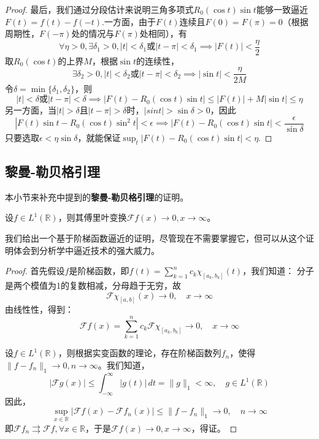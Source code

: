 \begin{proof}
    最后，我们通过分段估计来说明三角多项式$R_0(\cos t)\sin t$能够一致逼近$F(t)=f(t)-f(-t)$.一方面，由于$F(t)$连续且$F(0)=F(\pi)=0$（根据周期性，$F(-\pi)$处的情况与$F(\pi)$处相同），有
    $$\forall\eta>0,\exists\delta_1>0,|t|<\delta_1\text{或}|t-\pi|<\delta_1\implies |F(t)|<\frac{\eta}{2}$$
    取$R_0(\cos t)$的上界$M$，根据$\sin t$的连续性，
    $$\exists\delta_2>0,|t|<\delta_2\text{或}|t-\pi|<\delta_2\implies|\sin t|<\frac{\eta}{2M}$$
    令$\delta=\min\{\delta_1,\delta_2\}$，则
    $$|t|<\delta\text{或}|t-\pi|<\delta\implies |F(t)-R_0(\cos t)\sin t|\le|F(t)|+M|\sin t|\le\eta$$
    另一方面，当$|t|>\delta$且$|t-\pi|>\delta$时，$|sin t|>\sin\delta>0$，因此
    $$|F(t)\sin t-R_0(\cos t)\sin^2 t|<\epsilon\implies|F(t)-R_0(\cos t)\sin t|<\frac{\epsilon}{\sin\delta}$$
    只要选取$\epsilon<\eta\sin\delta$，就能保证$\sup_t |F(t)-R_0(\cos t)\sin t|<\eta$.
\end{proof}

\subsection{黎曼-勒贝格引理}\label{sub:riemman_lebesgue_lemma}
本小节来补充中提到的\textbf{黎曼-勒贝格引理}的证明。
\begin{theorem}[黎曼-勒贝格引理]\label{thm:riemann_lebesgue}
    设$f\in L^1(\mathbb{R})$，则其傅里叶变换$\mathcal{F} f(x)\to 0,x\to\infty$。
\end{theorem}
我们给出一个基于阶梯函数逼近的证明，尽管现在不需要掌握它，但可以从这个证明体会到分析学中逼近技术的强大威力。
\begin{proof}
    首先假设$f$是阶梯函数，即$f(t)=\sum_{k=1}^{n}c_k \chi_{[a_k,b_k]}(t)$，我们知道：
    分子是两个模值为1的复数相减，分母趋于无穷，故
    $$\mathcal{F} \chi_{[a,b]}(x)\to 0,\quad x\to\infty$$
    由线性性，得到：
    $$\mathcal{F} f(x)=\sum_{k=1}^n c_k\mathcal{F}\chi_{[a_k,b_k]}\to 0,\quad x\to\infty$$

    设$f\in L^1(\mathbb{R})$，则根据实变函数的理论，存在阶梯函数列$f_n$，使得$\|f-f_n\|_1\to 0,n\to\infty$。我们知道，
    \[|\mathcal{F} g(x)|\leq \int_{-\infty}^{\infty}|g(t)|\,dt=\|g\|_1<\infty,\quad g\in L^1(\mathbb{R})\]
    因此，
    \[\sup_{x\in\mathbb{R}}|\mathcal{F} f(x)-\mathcal{F} f_n(x)|\leq \|f-f_n\|_1\to 0,\quad n\to\infty\]
    即$\mathcal{F} f_n\rightrightarrows\mathcal{F} f,\forall x\in\mathbb{R}$，于是$\mathcal{F} f(x)\to 0,x\to\infty$，得证。
\end{proof}

